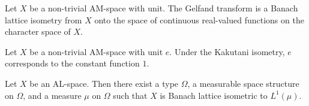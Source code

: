 \begin{theorem}
\label{thm:amSpaceWithUnit-kakutaniEquiv}
\leanok
{}
Let $X$ be a non-trivial AM-space with unit. The Gelfand transform
is a Banach lattice isometry from $X$ onto the space of continuous
real-valued functions on the character space of $X$.
\end{theorem}

\begin{lemma}
\label{lem:amSpaceWithUnit-kakutaniEquiv-unit}
\leanok
{}
Let $X$ be a non-trivial AM-space with unit $e$. Under the
Kakutani isometry, $e$ corresponds to the constant function $1$.
\end{lemma}

\begin{theorem}
\label{thm:alSpace-exists-L1-banachLatEquiv}
\leanok
{}
Let $X$ be an AL-space. Then there exist a type $\Omega$, a
measurable space structure on $\Omega$, and a measure $\mu$ on
$\Omega$ such that $X$ is Banach lattice isometric to $L^1(\mu)$.
\end{theorem}
